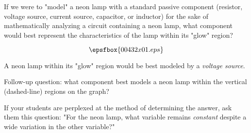 

If we were to "model" a neon lamp with a standard passive component (resistor, voltage source, current source, capacitor, or inductor) for the sake of mathematically analyzing a circuit containing a neon lamp, what component would best represent the characteristics of the lamp within its "glow" region?

$$\epsfbox{00432x01.eps}$$







A neon lamp within its "glow" region would be best modeled by a {\it voltage source}.

\vskip 10pt

Follow-up question: what component best models a neon lamp within the vertical (dashed-line) regions on the graph?







If your students are perplexed at the method of determining the answer, ask them this question: "For the neon lamp, what variable remains {\it constant} despite a wide variation in the other variable?"




